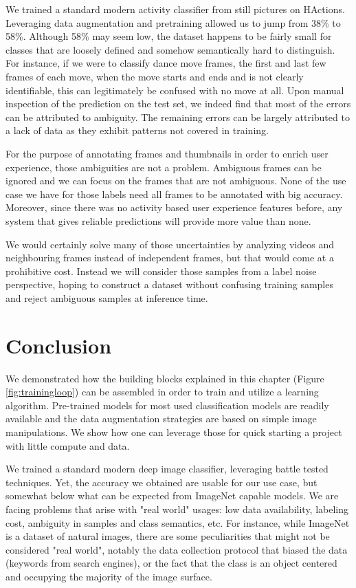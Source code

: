 We trained a standard modern activity classifier from still pictures on HActions. Leveraging data augmentation and pretraining allowed us to jump from 38\% to 58\%. Although 58\% may seem low, the dataset happens to be fairly small for classes that are loosely defined and somehow semantically hard to distinguish. For instance, if we were to classify dance move frames, the first and last few frames of each move, when the move starts and ends and is not clearly identifiable, this can legitimately be confused with no move at all. Upon manual inspection of the prediction on the test set, we indeed find that most of the errors can be attributed to ambiguity. The remaining errors can be largely attributed to a lack of data as they exhibit patterns not covered in training.

For the purpose of annotating frames and thumbnails in order to enrich user experience, those ambiguities are not a problem. Ambiguous frames can be ignored and we can focus on the frames that are not ambiguous. None of the use case we have for those labels need all frames to be annotated with big accuracy. Moreover, since there was no activity based user experience features before, any system that gives reliable predictions will provide more value than none.

We would certainly solve many of those uncertainties by analyzing videos and neighbouring frames instead of independent frames, but that would come at a prohibitive cost. Instead we will consider those samples from a label noise perspective, hoping to construct a dataset without confusing training samples and reject ambiguous samples at inference time.

\section{Conclusion}

We demonstrated how the building blocks explained in this chapter (Figure \ref{fig:trainingloop}) can be assembled in order to train and utilize a learning algorithm. Pre-trained models for most used classification models are readily available and the data augmentation strategies are based on simple image manipulations. We show how one can leverage those for quick starting a project with little compute and data.

We trained a standard modern deep image classifier, leveraging battle tested techniques. Yet, the accuracy we obtained are usable for our use case, but somewhat below what can be expected from ImageNet capable models. We are facing problems that arise with "real world" usages: low data availability, labeling cost, ambiguity in samples and class semantics, etc. For instance, while ImageNet is a dataset of natural images, there are some peculiarities that might not be considered "real world", notably the data collection protocol that biased the data (keywords from search engines), or the fact that the class is an object centered and occupying the majority of the image surface.

